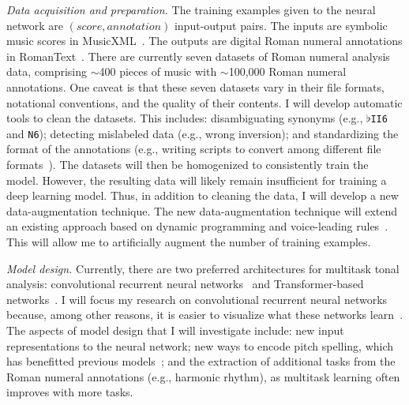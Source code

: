 \documentclass[12pt]{article}
\begin{document}
\emph{Data acquisition and preparation.}
The training examples given to the neural network are $(score, annotation)$ input-output pairs.
The inputs are symbolic music scores in MusicXML~\cite{good2001musicxml}.
The outputs are digital Roman numeral annotations in RomanText~\cite{gotham2019romantext}.
There are currently seven datasets of Roman numeral analysis data, comprising $\sim$400 pieces of music with $\sim$100,000 Roman numeral annotations.
One caveat is that these seven datasets vary in their file formats, notational conventions, and the quality of their contents.
I will develop automatic tools to clean the datasets.
This includes:
disambiguating synonyms (e.g., $\flat$\texttt{II6} and \texttt{N6});
detecting mislabeled data (e.g., wrong inversion);
and standardizing the format of the annotations (e.g., writing scripts to convert among different file formats~\cite{gotham2019romantext, napoleslopez2020harmalysis}).
The datasets will then be homogenized to consistently train the model.
However, the resulting data will likely remain insufficient for training a deep learning model.
Thus, in addition to cleaning the data, I will develop a new data-augmentation technique.
The new data-augmentation technique will extend an existing approach based on dynamic programming and voice-leading rules~\cite{napoleslopez2020harmonic}.
This will allow me to artificially augment the number of training examples.

\emph{Model design.}
Currently, there are two preferred architectures for multitask tonal analysis:
convolutional recurrent neural networks~\cite{micchi2020not} and Transformer-based networks~\cite{chen2021attend}.
I will focus my research on convolutional recurrent neural networks because, among other reasons, it is easier to visualize what these networks learn~\cite{lin2016visualizing}.
The aspects of model design that I will investigate include:
new input representations to the neural network;
new ways to encode pitch spelling, which has benefitted previous models~\cite{micchi2020not};
and the extraction of additional tasks from the Roman numeral annotations (e.g., harmonic rhythm), as multitask learning often improves with more tasks.
\end{document}
